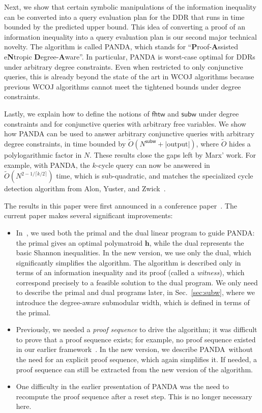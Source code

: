 \documentclass[10pt,a4paper]{article}
\newcommand{\panda}{\textsf{PANDA}\xspace}
\newcommand{\fhtw}{\textsf{fhtw}}
\newcommand{\subm}{\textsf{subw}}
\begin{document}
Next, we show that certain symbolic manipulations of the information inequality can be converted
into a query evaluation plan for the DDR that runs in time bounded by the predicted upper
bound.
This idea of converting a proof of an information inequality into a query evaluation plan
is our second major technical novelty.
The algorithm is called \panda,
which stands for ``{\bf P}roof-{\bf A}ssisted e{\bf N}tropic {\bf D}egree-{\bf A}ware''.
In particular, \panda is worst-case optimal for
DDRs under arbitrary degree constraints. Even when restricted to only conjunctive queries,
this is already beyond the state of the art in WCOJ algorithms because previous WCOJ
algorithms cannot meet the tightened bounds under degree constraints.

Lastly, we explain how to define the notions of $\fhtw$ and $\subm$ under degree constraints
and for conjunctive queries with arbitrary free variables.
We show how \panda can be used to answer arbitrary conjunctive queries with arbitrary
degree constraints, in time bounded by $\tilde O(N^{\subm} + |\text{output}|)$, where $\tilde O$ hides a polylogarithmic factor in $N$.
These results close the gaps left by Marx' work.
For example, with \panda,
the $k$-cycle query can now be answered in $\tilde O(N^{2-1/\lceil k/2\rceil })$ time, which is
sub-quadratic, and matches the specialized cycle detection algorithm
from Alon, Yuster, and Zwick~\cite{DBLP:journals/algorithmica/AlonYZ97}.



The results in this paper were first announced in a conference paper~\cite{DBLP:conf/pods/Khamis0S17}.  The current paper makes several
significant improvements:
%
\begin{itemize}
\item In~\cite{DBLP:conf/pods/Khamis0S17}, we used both the primal and the dual linear
  program to guide \panda: the primal gives an optimal polymatroid $\bm h$, while the dual
  represents the basic Shannon inequalities.  In the new version, we use only the dual,
  which significantly simplifies the algorithm.  The algorithm is described only in terms of
  an information inequality and its proof (called a {\em witness}), which correspond
  precisely to a feasible solution to the dual program.  We only need to describe the primal
  and dual programs later, in Sec.~\ref{sec:subw}, where we introduce the degree-aware
  submodular width, which is defined in terms of the primal.

\item Previously, we needed a {\em proof sequence} to drive the algorithm; it was difficult
  to prove that a proof sequence exists; for example, no proof sequence existed in our
  earlier framework~\cite{DBLP:conf/pods/KhamisNS16}.  In the new version, we describe
  \panda\ without the need for an explicit proof sequence, which again simplifies it. If
  needed, a proof sequence can still be extracted from the new version of the algorithm.

\item One difficulty in the earlier presentation of \panda was the
  need to recompute the proof sequence after a reset step.  This is no
  longer necessary here.
\end{itemize}
\end{document}
